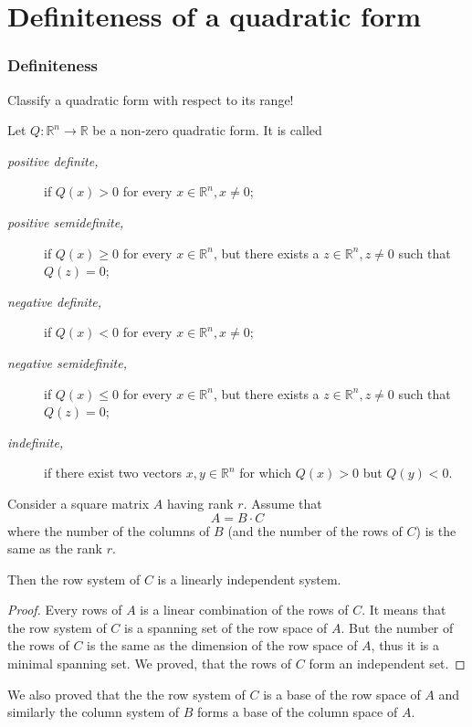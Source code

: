 \section{Definiteness of a quadratic form}
\begin{frame}
    \frametitle{Definiteness}
    Classify a quadratic form with respect to its range!
    \begin{definition}
        Let $Q:\mathbb{R}^n\to\mathbb{R}$ be a non-zero quadratic form. It is called
        \begin{description}
            \item[\emph{positive definite,}] if $Q\left( x \right)>0$ for every $x\in\mathbb{R}^n,x\neq 0$;
        \item[\emph{positive semidefinite,}] if $ Q\left( x \right)\geq 0$ for every $x\in\mathbb{R}^n$,
                but there exists a $z\in\mathbb{R}^n, z\neq 0$ such that $Q\left( z \right)=0$;
            \item[\emph{negative definite,}] if $ Q\left( x \right)<0$ for every $x\in\mathbb{R}^n,x\neq 0;$
            \item[\emph{negative semidefinite,}] if $ Q\left( x \right)\leq 0$ for every $x\in\mathbb{R}^n$,
                but there exists a $z\in\mathbb{R}^n, z\neq 0$ such that $Q\left( z \right)=0$;
            \item[\emph{indefinite,}] if there exist two vectors $x,y\in\mathbb{R}^n$ for which
                $Q\left( x \right)>0$ but $Q\left( y \right)<0$.
        \end{description}
    \end{definition}
\end{frame}
\begin{frame}
    \begin{theorem}
    Consider a square matrix $A$ having rank $r$. 
    Assume that 
    \[A=B\cdot C\] 
    where the number of the columns of $B$ (and the number of the rows of $C$) is the same as the rank $r$.
    
    Then the row system of $C$ is a linearly independent system.
    \end{theorem}
    \begin{proof}
        Every rows of $A$ is a linear combination of the rows of $C$. 
        It means that the row system of $C$ is a spanning set of the row space of $A$.
        But the number of the rows of $C$ is the same as the dimension of the row space of $A$, 
        thus it is a minimal spanning set.
        We proved, that the rows of $C$ form an independent set.
    \end{proof}
    We also proved that the 
    the row system of $C$ is a base of the row space of $A$ and similarly 
    the column system of $B$ forms a base of the column space of $A$.
\end{frame}


